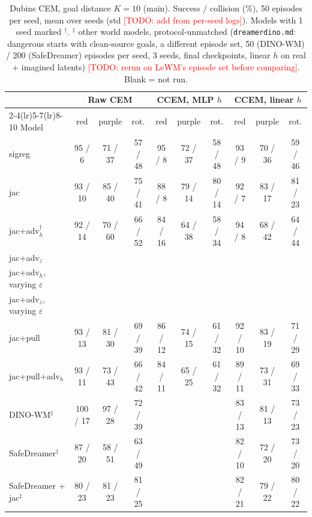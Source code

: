 \documentclass{article}
\newcommand{\todo}[1]{\textcolor{red}{[TODO: #1]}}
\begin{document}
\begin{table}[t]\centering\small
\caption{Dubins CEM, goal distance $K=10$ (main). Success / collision (\%), 50 episodes per seed, mean over seeds (std \todo{add from per-seed logs}). Models with 1 seed marked $^\dagger$. $^\ddagger$ other world models, protocol-unmatched (\texttt{dreamerdino.md}: dangerous starts with clean-source goals, a different episode set, 50 (DINO-WM) / 200 (SafeDreamer) episodes per seed, 3 seeds, final checkpoints, linear $h$ on real + imagined latents) \todo{rerun on LeWM's episode set before comparing}. Blank = not run.}
\label{tab:dubins_k10}
\begin{tabular}{lccccccccc}
\toprule
 & \multicolumn{3}{c}{Raw CEM} & \multicolumn{3}{c}{CCEM, MLP $h$} & \multicolumn{3}{c}{CCEM, linear $h$} \\
\cmidrule(lr){2-4}\cmidrule(lr){5-7}\cmidrule(lr){8-10}
Model & red & purple & rot. & red & purple & rot. & red & purple & rot. \\
\midrule
sigreg & 95 / 6 & 71 / 37 & 57 / 48 & 95 / 8 & 72 / 37 & 58 / 48 & 93 / 9 & 70 / 36 & 59 / 46 \\
jac & 93 / 10 & 85 / 40 & 75 / 41 & 88 / 8 & 79 / 14 & 80 / 14 & 92 / 7 & 83 / 17 & 81 / 23 \\
jac+adv$_h^\dagger$ & 92 / 14 & 70 / 60 & 66 / 52 & 84 / 16 & 64 / 38 & 58 / 34 & 94 / 8 & 68 / 42 & 64 / 44 \\
jac+adv$_z$ &  &  &  &  &  &  &  &  &  \\
jac+adv$_h$, varying $\varepsilon$ &  &  &  &  &  &  &  &  &  \\
jac+adv$_z$, varying $\varepsilon$ &  &  &  &  &  &  &  &  &  \\
\midrule
jac+pull & 93 / 13 & 81 / 30 & 69 / 39 & 86 / 12 & 74 / 15 & 61 / 32 & 92 / 10 & 83 / 19 & 71 / 29 \\
jac+pull+adv$_h$ & 93 / 11 & 73 / 43 & 66 / 42 & 84 / 11 & 65 / 25 & 61 / 32 & 89 / 11 & 73 / 31 & 69 / 33 \\
\midrule
DINO-WM$^\ddagger$ & 100 / 17 & 97 / 28 & 72 / 39 &  &  &  & 83 / 13 & 81 / 13 & 73 / 23 \\
SafeDreamer$^\ddagger$ & 87 / 20 & 58 / 51 & 63 / 49 &  &  &  & 82 / 10 & 72 / 20 & 73 / 20 \\
SafeDreamer + jac$^\ddagger$ & 80 / 23 & 81 / 23 & 81 / 25 &  &  &  & 82 / 21 & 79 / 22 & 80 / 22 \\
\bottomrule
\end{tabular}
\end{table}
\end{document}
